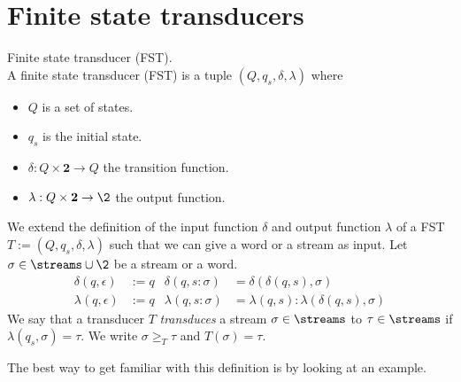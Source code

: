 \section{Finite state transducers}

\begin{definition}{Finite state transducer (FST).}\\
	A finite state transducer (FST) is a tuple $(Q,q_s,
	\delta,\lambda)$ where
	\begin{itemize}
		\item $Q$ is a set of states.
		\item $q_s$ is the initial state.
		\item $\delta: Q \times \mathbf{2} \to Q$ the transition function.
		\item $\lambda: Q \times \mathbf{2} \to \2$ the output function.
	\end{itemize}
\end{definition}

\begin{definition}
	We extend the definition of the input function $\delta$ and output function $\lambda$ of a FST $T := (Q,q_s,\delta, \lambda)$ such that we can give a word or a stream as input. Let $\sigma\in\streams\cup\2$ be a stream or a word.
	\begin{align*}
		\delta(q,\epsilon) &:= q & \delta(q,s : \sigma) &= \delta(\delta(q,s),\sigma)\\
		\lambda(q,\epsilon) &:= q & \lambda(q,s : \sigma) &= \lambda(q,s) : \lambda(\delta(q,s),\sigma)
	\end{align*}
	We say that a transducer $T$ \textit{transduces} a stream $\sigma\in\streams$ to $\tau\in\streams$ if $\lambda(q_s,\sigma) = \tau$. We write $\sigma \geq_{T} \tau$ and $T(\sigma) = \tau$.
\end{definition}

The best way to get familiar with this definition is by looking at an example.

